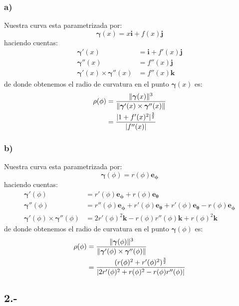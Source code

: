 \documentclass{article}
\DeclarePairedDelimiter{\norm}{\lVert}{\rVert}
\begin{document}
\begin{tcolorbox}
\subsubsection*{a)}
Nuestra curva esta parametrizada por:
\[ \bm{\gamma}(x) 
= x \bm{i} +  f(x) \bm{j} \]
haciendo cuentas:
\begin{align*}
    \bm{\gamma}'(x) &= \bm{i} + f'(x)\bm{j} \\
    \bm{\gamma}''(x) &= f''(x)\bm{j} \\
    \bm{\gamma}'(x) \times \bm{\gamma}''(x)
    &= f''(x)\bm{k}
\end{align*}
de donde obtenemos el radio de curvatura en el punto $\bm{\gamma}(x)$ es:
\begin{align*}
    \rho(\phi)
    &= \frac
    {\norm{\bm{\gamma}(x)}^3}
    {\norm{\bm{\gamma}'(x) \times \bm{\gamma}''(x)}} \\
    &= \frac
    {|1+f'(x)^2|^\frac{3}{2}}
    {|f''(x)|}
\end{align*}

\subsubsection*{b)}
Nuestra curva esta parametrizada por:
\[ \bm{\gamma}(\phi) = r(\phi)\bm{e_\phi} \]
haciendo cuentas:
\begin{align*}
    \bm{\gamma}'(\phi) 
    &= r'(\phi)\bm{e_\phi} + r(\phi)\bm{e_\theta} \\
    \bm{\gamma}''(\phi)
    &= r''(\phi)\bm{e_\phi} + r'(\phi)\bm{e_\theta}
    + r'(\phi)\bm{e_\theta} - r(\phi)\bm{e_\phi} \\
    \bm{\gamma}'(\phi) \times \bm{\gamma}''(\phi)
    &= 2r'(\phi)^2 \bm{k} 
    - r(\phi)r''(\phi) \bm{k} + r(\phi)^2 \bm{k}
\end{align*}
de donde obtenemos el radio de curvatura en el punto $\bm{\gamma}(\phi)$ es:
\begin{align*}
    \rho(\phi)
    &= \frac
    {\norm{\bm{\gamma}(\phi)}^3}
    {\norm{\bm{\gamma}'(\phi) \times \bm{\gamma}''(\phi)}} \\
    &= \frac
    {(r(\phi)^2 + r'(\phi)^2)^\frac{3}{2}}
    {| 2r'(\phi)^2 + r(\phi)^2 - r(\phi)r''(\phi)|}
\end{align*}
\end{tcolorbox}

\subsection*{2.-}
\end{document}
